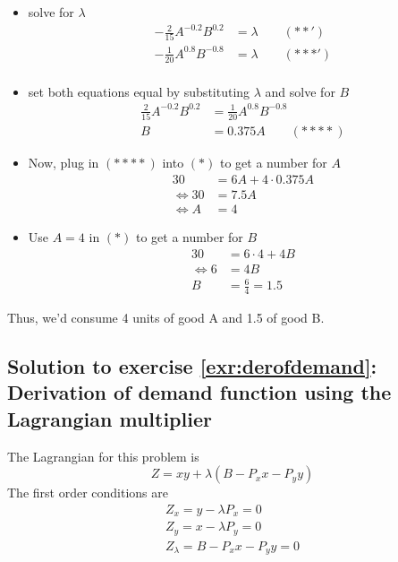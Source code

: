 \documentclass[
  12pt,
  oneside]{book}
\providecommand{\tightlist}{%
  \setlength{\itemsep}{0pt}\setlength{\parskip}{0pt}}
\theoremstyle{definition}
\theoremstyle{definition}
\theoremstyle{definition}
\theoremstyle{definition}
\theoremstyle{remark}
\begin{document}
\begin{itemize}
\tightlist
\item
  solve for \(\lambda\)
  \begin{align*}
    -\frac{2}{15} A^{-0.2}B^{0.2}&=\lambda \qquad (**')\\
        -\frac{1}{20} A^{0.8}B^{-0.8}&=\lambda \qquad (***')\\
  \end{align*}
\item
  set both equations equal by substituting \(\lambda\) and solve for \(B\)
  \begin{align*}
    \frac{2}{15} A^{-0.2}B^{0.2}&=  \frac{1}{20} A^{0.8}B^{-0.8}\\
    B&=0.375A \qquad (****) %
  \end{align*}
\item
  Now, plug in \((****)\) into \((*)\) to get a number for \(A\)
  \begin{align*}
    30&=6A+4\cdot 0.375 A\\
    \Leftrightarrow 30&=7.5A\\
    \Leftrightarrow A&=4
  \end{align*}
\item
  Use \(A=4\) in \((*)\) to get a number for \(B\)
  \begin{align*}
    30&=6\cdot 4+4 B\\
    \Leftrightarrow 6&=4B\\
    B&=\frac{6}{4}=1.5
  \end{align*}
\end{itemize}

Thus, we'd consume 4 units of good A and 1.5 of good B.

\hypertarget{sol:derofdemand}{%
\subsection*{Solution to exercise \ref{exr:derofdemand}: Derivation of demand function using the Lagrangian multiplier}\label{sol:derofdemand}}

The Lagrangian for this problem is
\[
  Z=x y+\lambda\left(B-P_{x} x-P_{y} y\right)
\]
The first order conditions are
\[
\begin{array}{l}
Z_{x}=y-\lambda P_{x}=0 \\
Z_{y}=x-\lambda P_{y}=0 \\
Z_{\lambda}=B-P_{x} x-P_{y} y=0
\end{array}
\]
\end{document}
